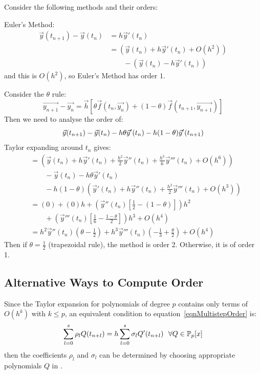 \documentclass[../Main.tex]{subfiles}
\begin{document}
\begin{examples}{
        Consider the following methods and their orders:
    }
    \item Euler's Method:
        \begin{align*}
            \vec{y}(t_{n + 1}) - \vec{y}(t_n) &= h \vec{y}'(t_n)\\
            &= \left(\vec{y}(t_n) + h \vec{y}'(t_n) + O(h^2)\right)\\
            &\qquad- \left(\vec{y}(t_n) - h \vec{y}'(t_n)\right)
        \end{align*}
        and this is $O(h^2)$, so Euler's Method has order $1$.
    \item Consider the $\theta$ rule:
        \begin{equation*}
            \vec{y_{n + 1}} - \vec{y_n} = \vec{h}\left[\theta \vec{f}(t_n, \vec{y_n}) + (1 - \theta)\vec{f}(t_{n+1}, \vec{y_{n+1}})\right]
        \end{equation*}
        Then we need to analyse the order of:
        \begin{equation*}
            \vec{y}(t_{n + 1}) - \vec{y}(t_n) -h\theta \vec{y}'(t_n) - h(1 - \theta) \vec{y}'(t_{n+1}) \\
        \end{equation*}
        Taylor expanding around $t_{n}$ gives:
        \begin{align*}
            &= \left(\vec{y}(t_n) + h \vec{y}'(t_n) + \frac{h^2}{2} \vec{y}''(t_n) + \frac{h^3}{6} \vec{y}'''(t_n) + O(h^6)\right)\\
            &\qquad- \vec{y}(t_n) - h\theta \vec{y}'(t_n) \\
            &\qquad-h(1-\theta) \left(\vec{y}'(t_n) + h\vec{y}''(t_n) + \frac{h^2}{2} \vec{y}'''(t_n) + O(h^3)\right) \\
            &= (0) + (0)h + \left(\vec{y}''(t_n) \left[\frac12 - (1 - \theta)\right]\right)h^2\\
            &\qquad+ \left(\vec{y}'''(t_n) \left[\frac16 - \frac{1-\theta}{2}\right]\right)h^3 + O(h^4) \\
            &= h^2 \vec{y}''(t_n) \left(\theta - \frac12\right) + h^3 \vec{y}'''(t_n) \left(-\frac13 + \frac{\theta}{2}\right) + O(h^4)
        \end{align*}
        Then if $\theta = \frac12$ (trapezoidal rule), the method is order 2. Otherwise, it is of order 1.
\end{examples}
\subsection{Alternative Ways to Compute Order}
Since the Taylor expansion for polynomials of degree $p$ contains only terms of $O(h^k)$ with $k \leq p$, an equivalent condition to equation~\ref{eqnMultistepOrder} is:
\begin{equation}
    \sum_{l=0}^{s} \rho_l Q(t_{n+l}) = h \sum_{l=0}^{s} \sigma_l Q'(t_{n+l})~~\forall Q \in \P_p[x]
    \label{eqnMultistepOrder2}
\end{equation}
then the coefficients $\rho_l$ and $\sigma_l$ can be determined by choosing appropriate polynomials $Q$ in .
\end{document}
